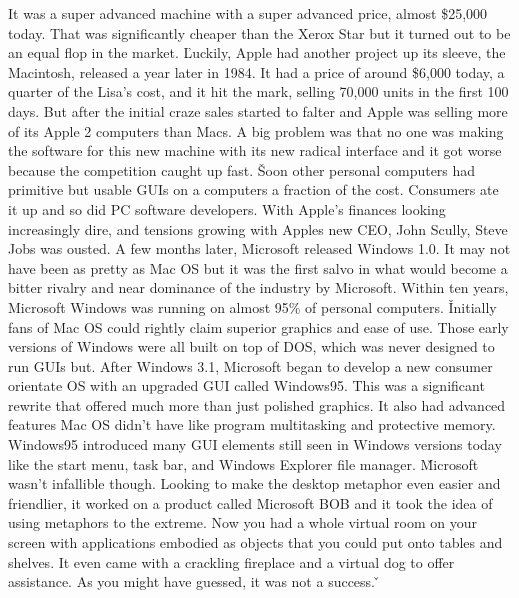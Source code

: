 
It was a super advanced machine with a super advanced price, almost \$25,000 today. That was significantly cheaper
than the Xerox Star but it turned out to be an equal flop in the market. \v

Luckily, Apple had another project up its sleeve, the Macintosh, released a year later in 1984. It had a price of
around \$6,000 today, a quarter of the Lisa's cost, and it hit the mark, selling 70,000 units in the first 100 days.
But after the initial craze sales started to falter and Apple was selling more of its Apple 2 computers than Macs. A
big problem was that no one was making the software for this new machine with its new radical interface and it got
worse because the competition caught up fast. \v

Soon other personal computers had primitive but usable GUIs on a computers a fraction of the cost. Consumers ate it
up and so did PC software developers. With Apple's finances looking increasingly dire, and tensions growing with
Apples new CEO, John Scully, Steve Jobs was ousted. A few months later, Microsoft released Windows 1.0. It may not
have been as pretty as Mac OS but it was the first salvo in what would become a bitter rivalry and near dominance of
the industry by Microsoft. Within ten years, Microsoft Windows was running on almost 95\% of personal computers. \v

Initially fans of Mac OS could rightly claim superior graphics and ease of use. Those early versions of Windows were
all built on top of DOS, which was never designed to run GUIs but. After Windows 3.1, Microsoft began to develop a
new consumer orientate OS with an upgraded GUI called Windows95. This was a significant rewrite that offered much
more than just polished graphics. It also had advanced features Mac OS didn't have like program multitasking and
protective memory. Windows95 introduced many GUI elements still seen in Windows versions today like the start menu,
task bar, and Windows Explorer file manager. \v

Microsoft wasn't infallible though. Looking to make the desktop metaphor even easier and friendlier, it worked on a
product called Microsoft BOB and it took the idea of using metaphors to the extreme. Now you had a whole virtual room
on your screen with applications embodied as objects that you could put onto tables and shelves. It even came with a
crackling fireplace and a virtual dog to offer assistance. As you might have guessed, it was not a success. \v

